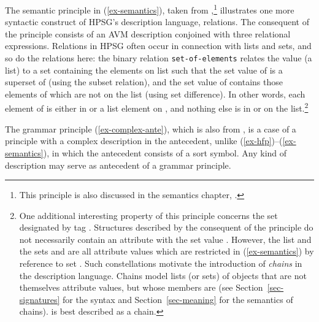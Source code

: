 \documentclass[output=paper
 	        ,biblatex
                ,babelshorthands
                ,newtxmath
                ,draftmode
                ,colorlinks, citecolor=brown
]{langscibook}
\begin{document}
{The semantic principle in (\ref{ex-semantics}), taken
from ,\footnote{This principle is also discussed
in the semantics chapter, \crossrefchapterw[\page \pageref{sign-cons}]{semantics}.}
illustrates one more syntactic
construct of HPSG's description language, relations. The consequent of
the principle consists of an AVM description conjoined with three
relational expressions.  Relations in HPSG often occur in
connection with lists and sets, and so do the relations here: the
binary relation \texttt{set-of-elements} relates the  value
(a list) to a set  containing the elements on list  such
that the set value  of  is a superset of 
(using the subset relation), and the set value  of 
contains those elements of  which are not on the
 list (using set difference). In other words,
each element of  is either in \mbox{} or
a list element on , and nothing else is in 
or on the  list.\footnote{One
  additional interesting property of this principle concerns the set
  designated by tag . Structures described by the consequent of
  the principle do not necessarily contain an attribute with the set
  value . However, the list  and the sets  and  are
  all attribute values which are restricted in (\ref{ex-semantics}) by reference to set
  . Such constellations motivate the introduction of
  \emph{chains} in the description language. Chains model lists (or
  sets) of objects that are not themselves attribute values, but whose
  members are (see Section~\ref{sec-signatures} for the syntax and
  Section~\ref{sec-meaning} for the semantics of chains).  is best
  described as a chain.}

The grammar principle (\ref{ex-complex-ante}), which is also from
, is a case of a principle
with a complex description in the antecedent,
unlike (\ref{ex-hfp})--(\ref{ex-semantics}), in which the antecedent
consists of a sort symbol. Any kind of description
may serve as antecedent of a grammar principle.

}
\end{document}
